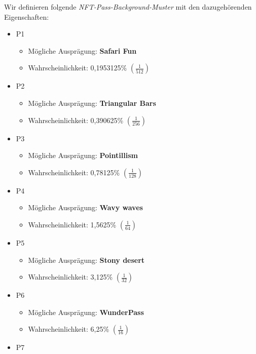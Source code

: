 \begin{NFT-Prop}

Wir definieren folgende \textit{NFT-Pass-Background-Muster} mit den dazugehörenden Eigenschaften:

\begin{itemize}
    \item P1
    \begin{itemize}
    	\item Mögliche Ausprägung: \textbf{Safari Fun} 
    	\item Wahrscheinlichkeit: 0,1953125\% $\left( \frac{1}{512} \right)$
    \end{itemize}
    \item P2
    \begin{itemize}
    	\item Mögliche Ausprägung: \textbf{Triangular Bars} 
    	\item Wahrscheinlichkeit: 0,390625\% $\left( \frac{1}{256} \right)$
    \end{itemize}
    \item P3
    \begin{itemize}
    	\item Mögliche Ausprägung: \textbf{Pointillism} 
    	\item Wahrscheinlichkeit: 0,78125\% $\left( \frac{1}{128} \right)$
    \end{itemize}
    \item P4
    \begin{itemize}
    	\item Mögliche Ausprägung: \textbf{Wavy waves} 
    	\item Wahrscheinlichkeit: 1,5625\% $\left( \frac{1}{64} \right)$
    \end{itemize}
    \item P5
    \begin{itemize}
    	\item Mögliche Ausprägung: \textbf{Stony desert} 
    	\item Wahrscheinlichkeit: 3,125\% $\left( \frac{1}{32} \right)$
    \end{itemize}
    \item P6
    \begin{itemize}
    	\item Mögliche Ausprägung: \textbf{WunderPass} 
    	\item Wahrscheinlichkeit: 6,25\% $\left( \frac{1}{16} \right)$
    \end{itemize}
    \item P7

\end{itemize}
\end{NFT-Prop}
